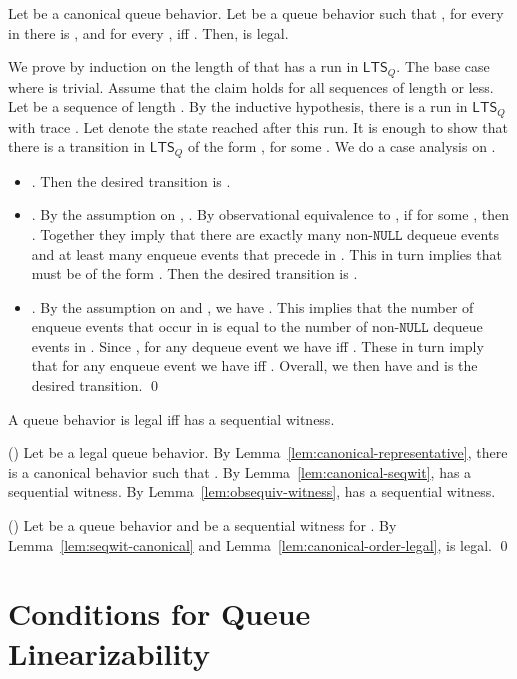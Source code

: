 \documentclass{LMCS}
\newcommand{\NULL}{\ensuremath{\mathtt{NULL}}}
\newcommand{\ltsq}{\ensuremath{{\mathsf{LTS}}_Q}}
\newcommand\mylabel[1]{\label{#1}}
\begin{document}
\begin{lem}\mylabel{lem:canonical-order-legal}
Let  be a canonical queue behavior.
Let  be a queue behavior such that , 
for every  in  there is , and 
for every ,  iff .
Then,  is legal.
\end{lem}
\proof
We prove by induction on the length of  that  has a run in {\ltsq}.
The base case where  is trivial.
Assume that the claim holds for all sequences of length  or less.
Let  be a sequence of length .
By the inductive hypothesis, there is a run  in {\ltsq} with trace .
Let  denote the state reached after this run.
It is enough to show that there is a transition in {\ltsq} of the form , for some .
We do a case analysis on .
\begin{itemize}
\item . 
Then the desired transition is .
\item .
By the assumption on , .
By observational equivalence to , if  for some , then .
Together they imply that there are exactly  many non-{\NULL} dequeue events and at least  many enqueue events that precede  in .
This in turn implies that  must be of the form .
Then the desired transition is .
\item .
By the assumption on  and , we have .
This implies that the number of enqueue events that occur in  is equal to the number of non-{\NULL} dequeue events in .
Since , for any dequeue event  we have  iff .
These in turn imply that for any enqueue event  we have  iff .
Overall, we then have  and  is the desired transition.
\qed
\end{itemize}

\begin{thm}\mylabel{thm:equiv-legal-seqwitness}
A queue behavior  is legal iff  has a sequential witness.
\end{thm}

\proof
()
Let  be a legal queue behavior.
By Lemma~\ref{lem:canonical-representative}, there is a canonical behavior  such that .
By Lemma~\ref{lem:canonical-seqwit},  has a sequential witness.
By Lemma~\ref{lem:obsequiv-witness},  has a sequential witness.

()
Let  be a queue behavior and  be a sequential witness for .
By Lemma~\ref{lem:seqwit-canonical} and Lemma~\ref{lem:canonical-order-legal},  is legal.
\qed

\section{Conditions for Queue Linearizability}
\label{sec:conditions}
\end{document}
